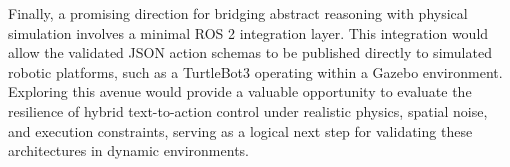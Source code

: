 \documentclass[a4paper]{article}
\begin{document}
Finally, a promising direction for bridging abstract reasoning with physical simulation involves a minimal ROS 2 integration layer. This integration would allow the validated JSON action schemas to be published directly to simulated robotic platforms, such as a TurtleBot3 operating within a Gazebo environment. Exploring this avenue would provide a valuable opportunity to evaluate the resilience of hybrid text-to-action control under realistic physics, spatial noise, and execution constraints, serving as a logical next step for validating these architectures in dynamic environments.

\newpage


\end{document}
